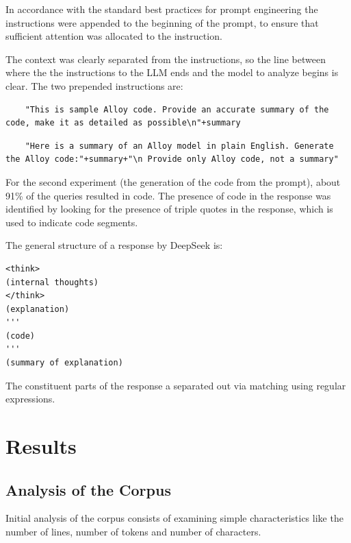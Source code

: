 \documentclass[conference]{IEEEtran}
\begin{document}
In accordance with the standard best practices for prompt engineering the instructions were appended to the beginning of the prompt, to ensure that sufficient attention was allocated to the instruction. 

The context was clearly separated from the instructions, so the line between where the the instructions to the LLM ends and the model to analyze begins is clear. The two prepended instructions are:

\begin{lstlisting}
    "This is sample Alloy code. Provide an accurate summary of the code, make it as detailed as possible\n"+summary
\end{lstlisting}

\begin{lstlisting}
    "Here is a summary of an Alloy model in plain English. Generate the Alloy code:"+summary+"\n Provide only Alloy code, not a summary"
\end{lstlisting}

For the second experiment (the generation of the code from the prompt), about 91\% of the queries resulted in code. The presence of code in the response was identified by looking for the presence of triple quotes in the response, which is used to indicate code segments.

The general structure of a response by DeepSeek is:

\begin{lstlisting}
<think>
(internal thoughts)
</think>
(explanation)
'''
(code)
'''
(summary of explanation)
\end{lstlisting}

The constituent parts of the response a separated out via matching using regular expressions.

\section{Results}

\subsection{Analysis of the Corpus}

Initial analysis of the corpus consists of examining simple characteristics like the number of lines, number of tokens and number of characters.
\end{document}
